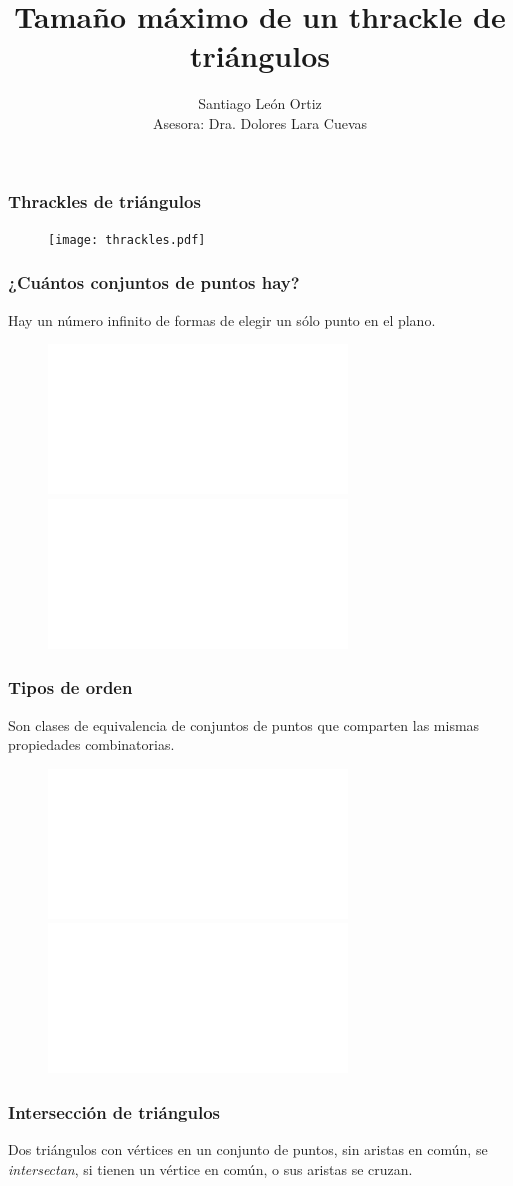 \documentclass{beamer}
\title{Tamaño máximo de un thrackle de triángulos}
\author [Santiago León O.] {Santiago León Ortiz\\ {\small Asesora: Dra. Dolores Lara Cuevas}}
\institute [Cinvestav, Computación] { }
\begin{document}
\begin{frame}
  \maketitle
\end{frame}

\begin{frame}
  \frametitle{Thrackles de triángulos}
  \begin{figure}[htb]
    \texttt{[image: thrackles.pdf]}
  \end{figure}
\end{frame}

\begin{frame}
  \frametitle{¿Cuántos conjuntos de puntos hay?}
  Hay un número infinito de formas de elegir un sólo punto en el plano.
  \begin{figure}[htb]
    \includegraphics<1>{puntos.pdf}
    \includegraphics<2>{puntos_1.pdf}
  \end{figure}
\end{frame}

\begin{frame}
  \frametitle{Tipos de orden}
  \begin{block}{}
    Son clases de equivalencia de conjuntos de puntos que comparten las mismas
    propiedades combinatorias.
  \end{block}
  \begin{figure}[htb]
    \includegraphics<1>{tipos_de_orden.pdf}
    \includegraphics<2>{tipos_de_orden_1.pdf}
  \end{figure}
\end{frame}

\begin{frame}
  \frametitle{Intersección de triángulos}

  \begin{block}{}
    Dos triángulos con vértices en un conjunto de puntos, sin aristas en común,
    se \emph{intersectan}, si tienen un vértice en común, o sus aristas se
    cruzan.
  \end{block}
  \begin{figure}[htb]
    \centering
    
  \end{figure}
\end{frame}
\end{document}
